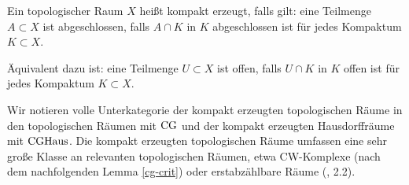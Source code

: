 \begin{defn} \label{def:cg}
  Ein topologischer Raum $X$ heißt kompakt erzeugt, falls gilt: eine
  Teilmenge $A \subset X$ ist abgeschlossen, falls $A \cap K$ in $K$
  abgeschlossen ist für jedes Kompaktum $K \subset X$.
\end{defn}
\begin{bem}
  Äquivalent dazu ist: eine Teilmenge $U \subset X$ ist offen, falls
  $U \cap K$ in $K$ offen ist für jedes Kompaktum $K \subset X$.
\end{bem}
Wir notieren volle Unterkategorie der kompakt erzeugten topologischen
Räume in den topologischen Räumen mit $\operatorname{CG}$ und der kompakt erzeugten
Hausdorffräume mit $\operatorname{CGHaus}$. Die kompakt erzeugten topologischen
Räume umfassen eine sehr große Klasse an relevanten topologischen
Räumen, etwa CW-Komplexe (nach dem nachfolgenden Lemma \ref{cg-crit})
oder erstabzählbare Räume (\cite{Steenrod}, 2.2).

